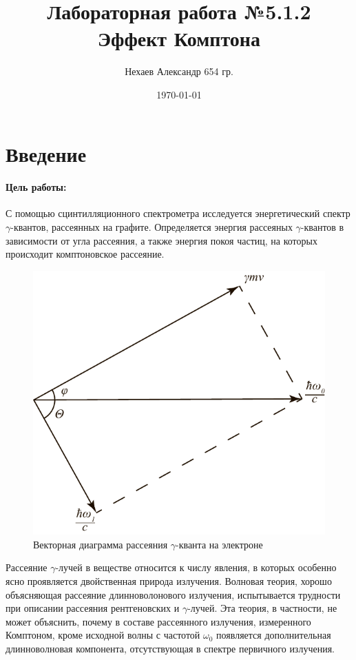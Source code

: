 \documentclass[a4paper, 12pt]{article}
\begin{document}
\title{Лабораторная работа №5.1.2\\Эффект Комптона}
\author{Нехаев Александр 654 гр.}
\date{\today}
\maketitle
\tableofcontents
\section{Введение}
\paragraph{Цель работы:}
С помощью сцинтилляционного спектрометра исследуется энергетический спектр $\gamma$-квантов, рассеянных на графите. Определяется энергия рассеяных $\gamma$-квантов в зависимости от угла рассеяния, а также энергия покоя частиц, на которых происходит комптоновское рассеяние.\par
\begin{figure}
	\begin{center}
		\includegraphics[width=\linewidth]{pic1.pdf}
		\caption{Векторная диаграмма рассеяния $\gamma$-кванта на электроне}
		\label{pic1}
	\end{center}
\end{figure}
Рассеяние $\gamma$-лучей в веществе относится к числу явления, в которых особенно ясно проявляется двойственная природа излучения. Волновая теория, хорошо объясняющая рассеяние длинноволонового излучения, испытывается трудности при описании рассеяния рентгеновских и $\gamma$-лучей. Эта теория, в частности, не может объяснить, почему в составе рассеянного излучения, измеренного Комптоном, кроме исходной волны с частотой $\omega_0$ появляется дополнительная длинноволновая компонента, отсутствующая в спектре первичного излучения.\par
\end{document}
